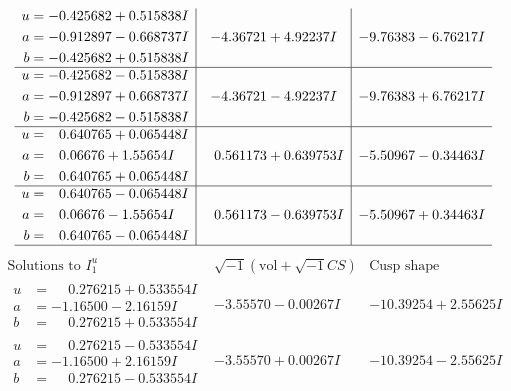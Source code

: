 \documentclass[1p]{elsarticle_modified}
\theoremstyle{definition}
\newcommand{\I}{\sqrt{-1}}
\begin{document}
$$\begin{array}{c|c|c}
\begin{aligned}
u &= -0.425682 + 0.515838 I \\
a &= -0.912897 - 0.668737 I \\
b &= -0.425682 + 0.515838 I\end{aligned}
 & -4.36721 + 4.92237 I & -9.76383 - 6.76217 I \\ \hline\begin{aligned}
u &= -0.425682 - 0.515838 I \\
a &= -0.912897 + 0.668737 I \\
b &= -0.425682 - 0.515838 I\end{aligned}
 & -4.36721 - 4.92237 I & -9.76383 + 6.76217 I \\ \hline\begin{aligned}
u &= \phantom{-}0.640765 + 0.065448 I \\
a &= \phantom{-}0.06676 + 1.55654 I \\
b &= \phantom{-}0.640765 + 0.065448 I\end{aligned}
 & \phantom{-}0.561173 + 0.639753 I & -5.50967 - 0.34463 I \\ \hline\begin{aligned}
u &= \phantom{-}0.640765 - 0.065448 I \\
a &= \phantom{-}0.06676 - 1.55654 I \\
b &= \phantom{-}0.640765 - 0.065448 I\end{aligned}
 & \phantom{-}0.561173 - 0.639753 I & -5.50967 + 0.34463 I\\
 \hline 
 \end{array}$$\newpage$$\begin{array}{c|c|c}  
\text{Solutions to }I^u_{1}& \I (\text{vol} + \sqrt{-1}CS) & \text{Cusp shape}\\
 \hline 
\begin{aligned}
u &= \phantom{-}0.276215 + 0.533554 I \\
a &= -1.16500 - 2.16159 I \\
b &= \phantom{-}0.276215 + 0.533554 I\end{aligned}
 & -3.55570 - 0.00267 I & -10.39254 + 2.55625 I \\ \hline\begin{aligned}
u &= \phantom{-}0.276215 - 0.533554 I \\
a &= -1.16500 + 2.16159 I \\
b &= \phantom{-}0.276215 - 0.533554 I\end{aligned}
 & -3.55570 + 0.00267 I & -10.39254 - 2.55625 I \\ \hline\begin{aligned}

\end{aligned}
\end{array}$$
\end{document}
